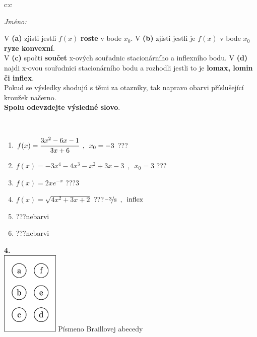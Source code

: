 \documentclass[10pt]{report}
\begin{document}
\begin{tabular}{c:c}
\begin{minipage}[c][104.5mm][t]{0.5\linewidth}
\begin{center}
\textit{Jméno:}\phantom{xxxxxxxxxxxxxxxxxxxxxxxxxxxxxxxxxxxxxxxxxxxxxxxxxxxxxxxxxxxxxxxxx}\\[5mm]
\begin{minipage}{0.95\linewidth}
\begin{center}
{\small V \textbf{(a)} zjisti jestli $f(x)$ \textbf{roste} v bode $x_0$. V \textbf{(b)} zjisti jestli je $f(x)$ v bode $x_0$ \textbf{ryze konvexní}.\\V \textbf{(c)} spočti \textbf{součet} x-ových souřadnic stacionárního a inflexního bodu. V \textbf{(d)} najdi x-ovou souřadnici stacionárního bodu a rozhodli jestli to je \textbf{lomax, lomin či inflex}.\\Pokud se výsledky shodujú s těmi za otazníky, tak napravo obarvi příslušející kroužek načerno.\\\textbf{Spolu odevzdejte výsledné slovo}}.
\end{center}
\end{minipage}
\\[1mm]
\begin{minipage}{0.79\linewidth}
\begin{center}
\begin{varwidth}{\linewidth}
\begin{enumerate}
\normalsize
\item $f(x)=\cfrac{3x^2-6x-1}{3x+6}\enspace , \enspace x_0=-3$\quad \dotfill\; ???\;\dotfill \quad {}
\item $f(x)=-3x^4-4x^3-x^2+3x-3\enspace , \enspace x_0=3$\quad \dotfill\; ???\;\dotfill \quad {}
\item $f(x)=2xe^{-x}$\quad \dotfill\; ???\;\dotfill \quad $3$
\item $f(x)=\sqrt{4x^2+3x+2}$\quad \dotfill\; ???\;\dotfill \quad $\nicefrac{-3}{8}\enspace , \enspace\mathrm{inflex}$
\item \quad \dotfill\; ???\;\dotfill \quad nebarvi
\item \quad \dotfill\; ???\;\dotfill \quad nebarvi
\end{enumerate}
\end{varwidth}
\end{center}
\end{minipage}
\begin{minipage}{0.20\linewidth}
\begin{center}
{\Huge\bfseries 4.} \\[2mm]
\includegraphics[height=40mm]{../images/braille.png}
{\small Písmeno Braillovej abecedy}
\end{center}
\end{minipage}
\end{center}
\end{minipage}
%
\end{tabular}
\end{document}
